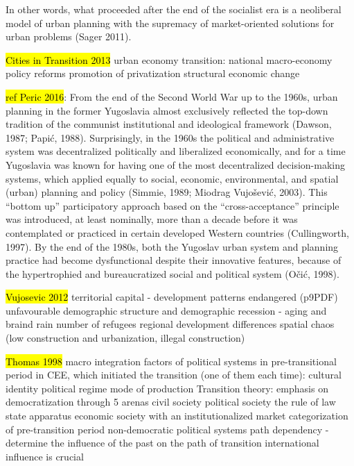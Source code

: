\documentclass[11pt]{report}
\begin{document}
In other words, what proceeded after the end of the socialist era is a neoliberal model of urban planning with the supremacy of market-oriented solutions for urban problems (Sager 2011).

\hl{Cities in Transition 2013}
urban economy transition:
    national macro-economy policy reforms
    promotion of privatization
    structural economic change

\hl{ref Peric 2016}: 
From the end of the Second World War up to the 1960s, urban planning in the former Yugoslavia almost exclusively reflected the top-down tradition of the communist institutional and ideological framework (Dawson, 1987; Papić, 1988). Surprisingly, in the 1960s the political and administrative system was decentralized politically and liberalized economically, and for a time Yugoslavia was known for having one of the most decentralized decision-making systems, which applied equally to social, economic, environmental, and spatial (urban) planning and policy (Simmie, 1989; Miodrag Vujošević, 2003). This “bottom up” participatory approach based on the “cross-acceptance” principle was introduced, at least nominally, more than a decade before it was contemplated or practiced in certain developed Western countries (Cullingworth, 1997). By the end of the 1980s, both the Yugoslav urban system and planning practice had become dysfunctional despite their innovative features, because of the hypertrophied and bureaucratized social and political system (Očić, 1998).

\hl{Vujosevic 2012}
territorial capital - development patterns endangered  (p9PDF)
    unfavourable demographic structure and demographic recession - aging and braind rain
    number of refugees
    regional development differences
    spatial chaos (low construction and urbanization, illegal construction)

\hl{Thomas 1998}
macro integration factors of political systems in pre-transitional period in CEE, which initiated the transition (one of them each time):
    cultural identity
    political regime
    mode of production
Transition theory:
    emphasis on democratization through 5 arenas
        civil society
        political society
        the rule of law
        state apparatus
        economic society with an institutionalized market
    categorization of pre-transition period
        non-democratic political systems
    path dependency - determine the influence of the past on the path of transition
    international influence is crucial
\end{document}
